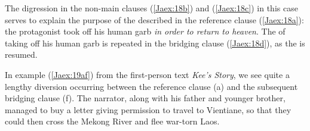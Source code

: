 \documentclass[output=paper]{LSP/langsci}
\begin{document}
\noindent
The digression in the non-main clauses (\ref{Jaex:18b}) and (\ref{Jaex:18c}) in this case serves to explain the purpose of the  described in the reference clause (\ref{Jaex:18a}): the protagonist took off his human garb \textit{in order to return to heaven}. The  of taking off his human garb is repeated in the bridging clause (\ref{Jaex:18d}), as the  is resumed.
 
In example (\ref{Jaex:19af}) from the first-person  text \textit{Kee’s Story}, we see quite a lengthy diversion occurring between the reference clause (a) and the subsequent bridging clause (f). The narrator, along with his father and younger brother, managed to buy a letter giving permission to travel to Vientiane, so that they could then cross the Mekong River and flee war-torn Laos.
 
\end{document}
